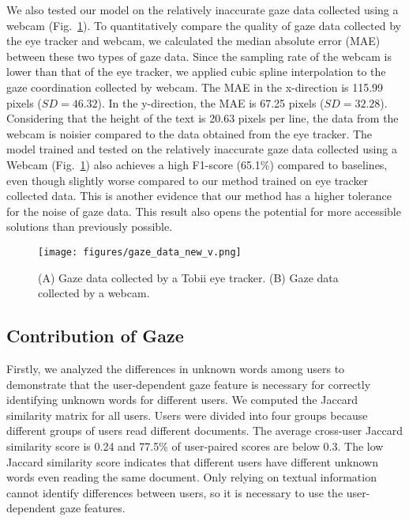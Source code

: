 We also tested our model on the relatively inaccurate gaze data collected using a webcam (Fig.~\ref{fig:gaze}). To quantitatively compare the quality of gaze data collected by the eye tracker and webcam, we calculated the median absolute error (MAE) between these two types of gaze data. Since the sampling rate of the webcam is lower than that of the eye tracker, we applied cubic spline interpolation to the gaze coordination collected by webcam. The MAE in the x-direction is 115.99 pixels ($SD = 46.32$). In the y-direction, the MAE is 67.25 pixels ($SD = 32.28$). Considering that the height of the text is 20.63 pixels per line, the data from the webcam is noisier compared to the data obtained from the eye tracker. The model trained and tested on the relatively inaccurate gaze data collected using a Webcam (Fig.~\ref{fig:gaze}) also achieves a high F1-score (65.1\%) compared to baselines, even though slightly worse compared to our method trained on eye tracker collected data. This is another evidence that our method has a higher tolerance for the noise of gaze data. This result also opens the potential for more accessible solutions than previously possible.

\begin{figure}
  \centering
  \texttt{[image: figures/gaze\_data\_new\_v.png]}
  \caption{(A) Gaze data collected by a Tobii eye tracker. (B) Gaze data collected by a webcam.}
  \label{fig:gaze} 
\end{figure}

\subsection{Contribution of Gaze}
\label{sec:contribution_gaze}

Firstly, we analyzed the differences in unknown words among users to demonstrate that the user-dependent gaze feature is necessary for correctly identifying unknown words for different users. We computed the Jaccard similarity matrix for all users. Users were divided into four groups because different groups of users read different documents. The average cross-user Jaccard similarity score is 0.24 and 77.5\% of user-paired scores are below 0.3. The low Jaccard similarity score indicates that different users have different unknown words even reading the same document. Only relying on textual information cannot identify differences between users, so it is necessary to use the user-dependent gaze features.

